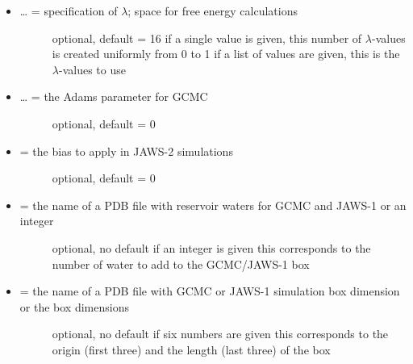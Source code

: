 \documentclass[letterpaper,10pt,english]{sphinxmanual}
\begin{document}
\begin{itemize}
\begin{description}
\end{description}

\item {} \begin{description}
\item[{ … = specification of \(\lambda\); space for free energy calculations}] \leavevmode
optional, default = 16
if a single value is given, this number of \(\lambda\)-values is created uniformly from 0 to 1
if a list of values are given, this is the \(\lambda\)-values to use

\end{description}

\item {} \begin{description}
\item[{ … = the Adams parameter for GCMC}] \leavevmode
optional, default = 0

\end{description}

\item {} \begin{description}
\item[{ = the bias to apply in JAWS-2 simulations}] \leavevmode
optional, default = 0

\end{description}

\item {} \begin{description}
\item[{ = the name of a PDB file with reservoir waters for GCMC and JAWS-1 or an integer}] \leavevmode
optional, no default
if an integer is given this corresponds to the number of water to add to the GCMC/JAWS-1 box

\end{description}

\item {} \begin{description}
\item[{ = the name of a PDB file with GCMC or JAWS-1 simulation box dimension or the box dimensions}] \leavevmode
optional, no default
if six numbers are given this corresponds to the origin (first three) and the length (last three) of the box


\end{description}
\end{itemize}
\end{document}
